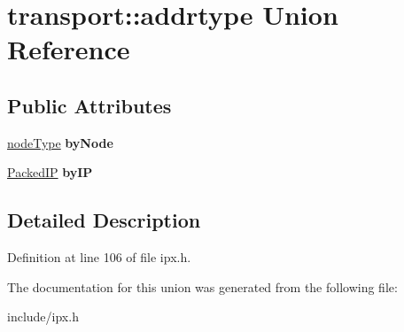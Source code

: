 \hypertarget{uniontransport_1_1addrtype}{\section{transport\-:\-:addrtype Union Reference}
\label{uniontransport_1_1addrtype}
}
\subsection*{Public Attributes}
\begin{DoxyCompactItemize}
\item 
\hypertarget{uniontransport_1_1addrtype_aaf06327a5a6219ca8de597b347a253f9}{\hyperlink{structnodeType}{node\-Type} {\bfseries by\-Node}}\label{uniontransport_1_1addrtype_aaf06327a5a6219ca8de597b347a253f9}

\item 
\hypertarget{uniontransport_1_1addrtype_a2d47a585adde032fc91a64b33efb9b07}{\hyperlink{structPackedIP}{Packed\-I\-P} {\bfseries by\-I\-P}}\label{uniontransport_1_1addrtype_a2d47a585adde032fc91a64b33efb9b07}

\end{DoxyCompactItemize}


\subsection{Detailed Description}


Definition at line 106 of file ipx.\-h.



The documentation for this union was generated from the following file\-:\begin{DoxyCompactItemize}
\item 
include/ipx.\-h\end{DoxyCompactItemize}
